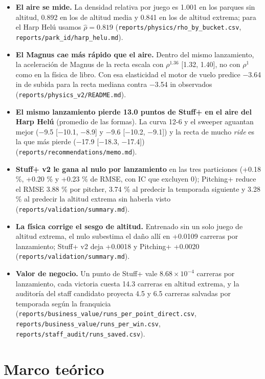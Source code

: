 \documentclass[
  english,
  spanish,
  10pt,
  letterpaper,
]{article}
\providecommand{\tightlist}{%
  \setlength{\itemsep}{0pt}\setlength{\parskip}{0pt}}
\let\diablosTT\texttt
\renewcommand{\texttt}[1]{{\color{gris}\fontsize{8.2}{10}\selectfont\diablosTT{#1}}}
\begin{document}
\begin{itemize}
\tightlist
\item
  \textbf{El aire se mide.} La densidad relativa por juego es 1.001 en
  los parques sin altitud, 0.892 en los de altitud media y 0.841 en los
  de altitud extrema; para el Harp Helú usamos \(\hat\rho = 0.819\)
  (\texttt{reports/physics/rho\_by\_bucket.csv},
  \texttt{reports/park\_id/harp\_helu.md}).
\item
  \textbf{El Magnus cae más rápido que el aire.} Dentro del mismo
  lanzamiento, la aceleración de Magnus de la recta escala con
  \(\rho^{1.36}\) {[}1.32, 1.40{]}, no con \(\rho^1\) como en la física
  de libro. Con esa elasticidad el motor de vuelo predice −3.64 in de
  subida para la recta mediana contra −3.54 in observados
  (\texttt{reports/physics\_v2/README.md}).
\item
  \textbf{El mismo lanzamiento pierde 13.0 puntos de Stuff+ en el aire
  del Harp Helú} (promedio de las formas). La curva 12-6 y el sweeper
  aguantan mejor (−9.5 {[}−10.1, −8.9{]} y −9.6 {[}−10.2, −9.1{]}) y la
  recta de mucho \emph{ride} es la que más pierde (−17.9 {[}−18.3,
  −17.4{]}) (\texttt{reports/recommendations/memo.md}).
\item
  \textbf{Stuff+ v2 le gana al nulo por lanzamiento} en las tres
  particiones (+0.18 \%, +0.20 \% y +0.23 \% de RMSE, con IC que
  excluyen 0); Pitching+ reduce el RMSE 3.88 \% por pitcher, 3.74 \% al
  predecir la temporada siguiente y 3.28 \% al predecir la altitud
  extrema sin haberla visto (\texttt{reports/validation/summary.md}).
\item
  \textbf{La física corrige el sesgo de altitud.} Entrenado sin un solo
  juego de altitud extrema, el nulo subestima el daño allí en +0.0109
  carreras por lanzamiento; Stuff+ v2 deja +0.0018 y Pitching+ +0.0020
  (\texttt{reports/validation/summary.md}).
\item
  \textbf{Valor de negocio.} Un punto de Stuff+ vale
  \(8.68\times10^{-4}\) carreras por lanzamiento, cada victoria cuesta
  14.3 carreras en altitud extrema, y la auditoría del staff candidato
  proyecta 4.5 y 6.5 carreras salvadas por temporada según la franquicia
  (\texttt{reports/business\_value/runs\_per\_point\_direct.csv},
  \texttt{reports/business\_value/runs\_per\_win.csv},
  \texttt{reports/staff\_audit/runs\_saved.csv}).
\end{itemize}

\section{Marco teórico}\label{marco-teuxf3rico}
\end{document}
